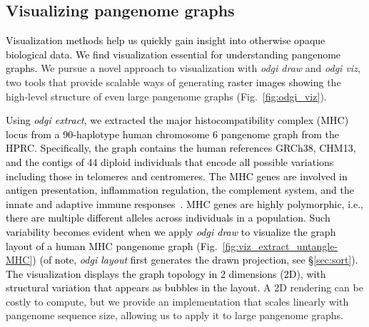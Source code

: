\documentclass{bioinfo}
\newcommand{\REVIEWED}[1]{{\textcolor{Black}{#1}}}
\begin{document}
\subsection{Visualizing pangenome graphs}
\label{sec:viz}


\REVIEWED{Visualization methods help us quickly gain insight into otherwise opaque biological data.
We find visualization essential for understanding pangenome graphs.}
We pursue a novel approach to visualization with \textit{odgi draw} and \textit{odgi viz}, two tools that provide scalable ways of generating \REVIEWED{raster images showing} the high-level structure of even large pangenome graphs (Fig.~\ref{fig:odgi_viz}).

\REVIEWED{Using \textit{odgi extract}, we extracted the major histocompatibility complex (MHC) locus from a 90-haplotype human chromosome 6 pangenome graph from the HPRC.
Specifically, the graph contains the human references GRCh38, CHM13, and the contigs of 44 diploid individuals that encode all possible variations including those in telomeres and centromeres.
The MHC genes are involved in antigen presentation, inflammation regulation, the complement system, and the innate and adaptive immune responses~\citep{Shiina2009}.
MHC genes are highly polymorphic, i.e., there are multiple different alleles across individuals in a population.
Such variability becomes evident when we apply \textit{odgi draw} to visualize the graph layout of a human MHC pangenome graph (Fig.~\ref{fig:viz_extract_untangle-MHC}) (of note, \textit{odgi layout} first generates the drawn projection, see \S\ref{sec:sort}).
The visualization displays the graph topology in 2 dimensions (2D), with structural variation that appears as bubbles in the layout.}
A 2D rendering can be costly to compute, but we provide an implementation that scales linearly with pangenome sequence size, allowing us to apply it to large pangenome graphs.
\end{document}
